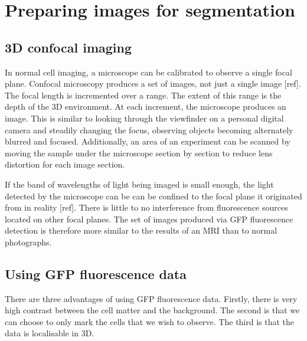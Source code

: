 
\chapter{Preparing images for segmentation}

\ifpdf
    \graphicspath{{Chapter3/Figs/Raster/}{Chapter3/Figs/PDF/}{Chapter3/Figs/}}
\else
    \graphicspath{{Chapter3/Figs/Vector/}{Chapter3/Figs/}}
\fi

\section{3D confocal imaging}

In normal cell imaging, a microscope can be calibrated to observe a single focal plane. Confocal microscopy produces a set of images, not just a single image [ref]. The focal length is incremented over a range. The extent of this range is the depth of the 3D environment. At each increment, the microscope produces an image. This is similar to looking through the viewfinder on a personal digital camera and steadily changing the focus, observing objects becoming alternately blurred and focused. Additionally, an area of an experiment can be scanned by moving the sample under the microscope section by section to reduce lens distortion for each image section. 

If the band of wavelengths of light being imaged is small enough, the light detected by the microscope can be can be confined to the focal plane it originated from in reality [ref]. There is little to no interference from fluorescence sources located on other focal planes. The set of images produced via GFP fluorescence detection is therefore more similar to the results of an MRI than to normal photographs.

\section{Using GFP fluorescence data}

There are three advantages of using GFP fluorescence data. Firstly, there is very high contrast between the cell matter and the background. The second is that we can choose to only mark the cells that we wish to observe. The third is that the data is localisable in 3D.


